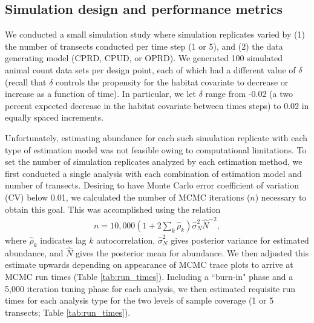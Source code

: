 \documentclass[12pt,fleqn]{article}
\begin{document}
\begin{flushleft}
\subsection{Simulation design and performance metrics}

We conducted a small simulation study where simulation replicates varied by (1) the number of transects conducted per time step (1 or 5), and (2) the data generating model (CPRD, CPUD, or OPRD).  We generated 100 simulated animal count data sets per design point, each of which had a different value of $\delta$ (recall that $\delta$ controls the propensity for the habitat covariate to decrease or increase as a function of time).  In particular, we let $\delta$ range from -0.02 (a two percent expected decrease in the habitat covariate between times steps) to 0.02 in equally spaced increments.

\hspace{.5in} Unfortunately, estimating abundance for each such simulation replicate with each type of estimation model was not feasible owing to computational limitations.  To set the number of simulation replicates analyzed by each estimation method, we first conducted a single analysis with each combination of estimation model and number of transects.  Desiring to have Monte Carlo error coefficient of variation (CV) below 0.01, we calculated the number of MCMC iterations ($n$) necessary to obtain this goal.  This was accomplished using the relation
\begin{eqnarray*}
  n = 10,000(1+2 \sum_k \hat{\rho}_k)\hat{\sigma}_N^2 \hat{N}^{-2},
\end{eqnarray*}
where $\hat{\rho}_k$ indicates lag $k$ autocorrelation, $\hat{\sigma}_N^2$ gives posterior variance for
estimated abundance, and $\hat{N}$ gives the posterior mean for abundance.  We then adjusted this estimate upwards depending on appearance of MCMC trace plots to arrive at MCMC run times (Table \ref{tab:run_times}). Including a ``burn-in" phase and a 5,000 iteration tuning phase for each analysis, we then estimated requisite run times for each analysis type for the two levels of sample coverage (1 or 5 transects; Table \ref{tab:run_times}).


\end{flushleft}
\end{document}

